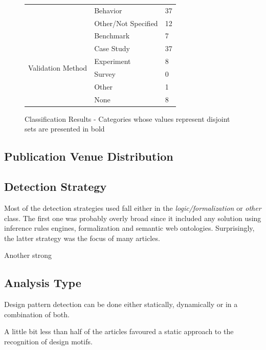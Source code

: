 \documentclass[letterpaper, 10 pt, conference]{ieeeconf}  %
\begin{document}
\begin{figure}
\begin{tabular}{ lll }
    & \multicolumn{1}{l}{Behavior}    & \multicolumn{1}{l}{37} \\
    & \multicolumn{1}{l}{Other/Not Specified}
                                       & \multicolumn{1}{l}{12} \\
    \hline
    \multirow{6}{*}{Validation Method}
    & \multicolumn{1}{l}{Benchmark}    & \multicolumn{1}{l}{7} \\
    & \multicolumn{1}{l}{Case Study}   & \multicolumn{1}{l}{37} \\
    & \multicolumn{1}{l}{Experiment}   & \multicolumn{1}{l}{8} \\
    & \multicolumn{1}{l}{Survey}       & \multicolumn{1}{l}{0} \\
    & \multicolumn{1}{l}{Other}        & \multicolumn{1}{l}{1} \\
    & \multicolumn{1}{l}{None}         & \multicolumn{1}{l}{8}
   \end{tabular}
   \caption{Classification Results - Categories whose values represent disjoint sets are presented in bold}

\end{figure}

\subsection{Publication Venue Distribution}


\subsection{Detection Strategy}

Most of the detection strategies used fall either in the 
\textit{logic/formalization} or \textit{other} class.
The first one was probably overly broad since it included any solution using
inference rules engines, formalization and semantic web ontologies.
Surprisingly, the latter strategy was the focus of many articles.

Another strong 


\subsection{Analysis Type}

Design pattern detection can be done either statically, dynamically or in
a combination of both.

A little bit less than half of the articles favoured a static approach to the
recognition of design motifs.
\end{document}
